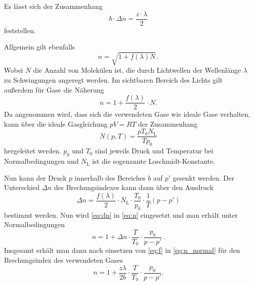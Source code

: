 Es lässt sich der Zusammenhang 
\begin{equation}
    b \cdot \Delta n = \frac{z \cdot \lambda}{2}
    \label{eq:f}
\end{equation}
feststellen.

Allgemein gilt ebenfalls
\begin{equation}
    n = \sqrt{1 + f(\lambda)N} \, .
\end{equation}
Wobei $N$ die Anzahl von Molekülen ist, die durch Lichtwellen der Wellenlänge $\lambda$ zu Schwingungen angeregt werden.
Im sichtbaren Bereich des Lichts gilt außerdem für Gase die Näherung
\begin{equation}
    n = 1 + \frac{f(\lambda)}{2} \cdot N.
    \label{eq:n}
\end{equation}
Da angenommen wird, dass sich die verwendeten Gase wie ideale Gase verhalten, kann über die ideale Gasgleichung $pV=RT$ der Zusammenhang
\begin{equation}
    N(p,T) = \frac{p T_0 N_\text{L}}{T p_0}
\end{equation}
hergeleitet werden.
$p_0$ und $T_0$ sind jeweils Druck und Temperatur bei Normalbedingungen und $N_\text{L}$ ist die sogenannte Loschmidt-Konstante.

Nun kann der Druck $p$ innerhalb des Bereiches $b$ auf $p'$ gesenkt werden.
Der Unterschied $\Delta n$ des Brechungsindexes kann dann über den Ausdruck
\begin{equation}
    \Delta n = \frac{f(\lambda)}{2} \cdot N_\text{L} \cdot \frac{T_0}{p_0} \cdot \frac{1}{T} (p - p')
    \label{eq:dn}
\end{equation}
bestimmt werden.
Nun wird \autoref{eq:dn} in \autoref{eq:n} eingesetzt und man erhält unter Normalbedingungen
\begin{equation}
    n = 1 + \Delta n \cdot \frac{T}{T_0} \cdot \frac{p_0}{p-p'} \, .
    \label{eq:n_normal}
\end{equation}
Insgesamt erhält man dann nach einsetzen von \autoref{eq:f} in \autoref{eq:n_normal} für den Brechungsindex des verwendeten Gases
\begin{equation}
    n = 1 + \frac{z \lambda}{2  b } \cdot \frac{T}{T_0} \cdot \frac{p_0}{p - p'}.
    \label{eq:index}
\end{equation}